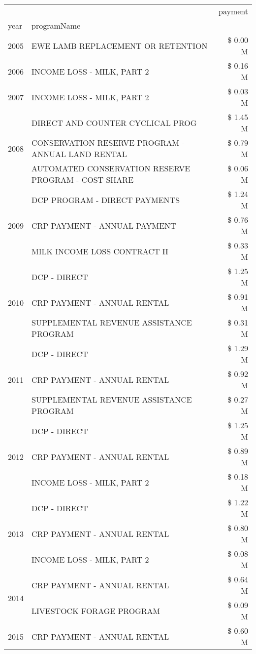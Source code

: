 \begin{tabular}{llr}
\toprule
 &  & payment \\
year & programName &  \\
\midrule
2005 & EWE LAMB REPLACEMENT OR RETENTION & \$ 0.00 M \\
\cline{1-3}
2006 & INCOME LOSS - MILK, PART 2 & \$ 0.16 M \\
\cline{1-3}
2007 & INCOME LOSS - MILK, PART 2 & \$ 0.03 M \\
\cline{1-3}
\multirow[t]{3}{*}{2008} & DIRECT AND COUNTER CYCLICAL PROG & \$ 1.45 M \\
 & CONSERVATION RESERVE PROGRAM - ANNUAL LAND RENTAL & \$ 0.79 M \\
 & AUTOMATED CONSERVATION RESERVE PROGRAM - COST SHARE & \$ 0.06 M \\
\cline{1-3}
\multirow[t]{3}{*}{2009} & DCP PROGRAM - DIRECT PAYMENTS & \$ 1.24 M \\
 & CRP PAYMENT - ANNUAL PAYMENT & \$ 0.76 M \\
 & MILK INCOME LOSS CONTRACT II & \$ 0.33 M \\
\cline{1-3}
\multirow[t]{3}{*}{2010} & DCP - DIRECT & \$ 1.25 M \\
 & CRP PAYMENT - ANNUAL RENTAL & \$ 0.91 M \\
 & SUPPLEMENTAL REVENUE ASSISTANCE PROGRAM & \$ 0.31 M \\
\cline{1-3}
\multirow[t]{3}{*}{2011} & DCP - DIRECT & \$ 1.29 M \\
 & CRP PAYMENT - ANNUAL RENTAL & \$ 0.92 M \\
 & SUPPLEMENTAL REVENUE ASSISTANCE PROGRAM & \$ 0.27 M \\
\cline{1-3}
\multirow[t]{3}{*}{2012} & DCP - DIRECT & \$ 1.25 M \\
 & CRP PAYMENT - ANNUAL RENTAL & \$ 0.89 M \\
 & INCOME LOSS - MILK, PART 2 & \$ 0.18 M \\
\cline{1-3}
\multirow[t]{3}{*}{2013} & DCP - DIRECT & \$ 1.22 M \\
 & CRP PAYMENT - ANNUAL RENTAL & \$ 0.80 M \\
 & INCOME LOSS - MILK, PART 2 & \$ 0.08 M \\
\cline{1-3}
\multirow[t]{2}{*}{2014} & CRP PAYMENT - ANNUAL RENTAL & \$ 0.64 M \\
 & LIVESTOCK FORAGE PROGRAM & \$ 0.09 M \\
\cline{1-3}
\multirow[t]{3}{*}{2015} & CRP PAYMENT - ANNUAL RENTAL & \$ 0.60 M \\

\end{tabular}
